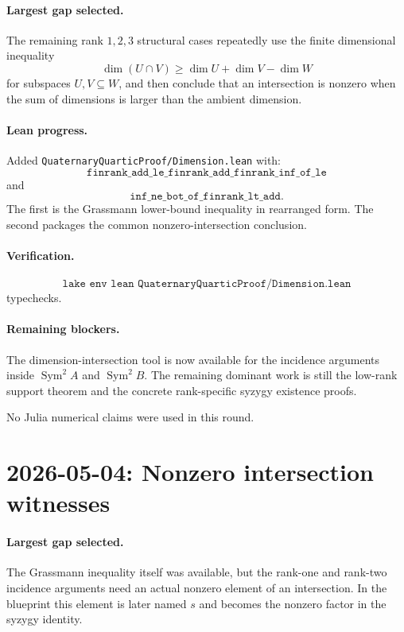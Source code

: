 \documentclass[11pt]{article}
\begin{document}
\paragraph{Largest gap selected.}
The remaining rank \(1,2,3\) structural cases repeatedly use the finite
dimensional inequality
\[
\dim(U\cap V)\ge \dim U+\dim V-\dim W
\]
for subspaces \(U,V\subseteq W\), and then conclude that an intersection is
nonzero when the sum of dimensions is larger than the ambient dimension.

\paragraph{Lean progress.}
Added \texttt{QuaternaryQuarticProof/Dimension.lean} with:
\[
\texttt{finrank\_add\_le\_finrank\_add\_finrank\_inf\_of\_le}
\]
and
\[
\texttt{inf\_ne\_bot\_of\_finrank\_lt\_add}.
\]
The first is the Grassmann lower-bound inequality in rearranged form.  The
second packages the common nonzero-intersection conclusion.

\paragraph{Verification.}
\[
\texttt{lake env lean QuaternaryQuarticProof/Dimension.lean}
\]
typechecks.

\paragraph{Remaining blockers.}
The dimension-intersection tool is now available for the incidence arguments
inside \(\operatorname{Sym}^2A\) and \(\operatorname{Sym}^2B\).  The remaining
dominant work is still the low-rank support theorem and the concrete
rank-specific syzygy existence proofs.

No Julia numerical claims were used in this round.

\section*{2026-05-04: Nonzero intersection witnesses}

\paragraph{Largest gap selected.}
The Grassmann inequality itself was available, but the rank-one and rank-two
incidence arguments need an actual nonzero element of an intersection.  In the
blueprint this element is later named \(s\) and becomes the nonzero factor in
the syzygy identity.
\end{document}
